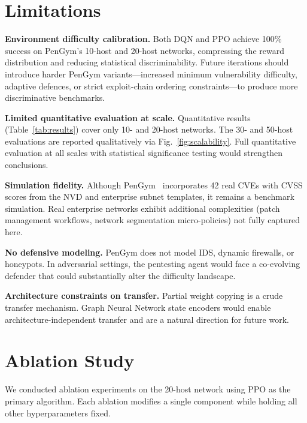 \documentclass[conference]{IEEEtran}
\begin{document}
\section{Limitations}
\label{sec:limitations}

\textbf{Environment difficulty calibration.}  Both DQN and PPO achieve
100\% success on PenGym's 10-host and 20-host networks, compressing the reward
distribution and reducing statistical discriminability.  Future
iterations should introduce harder PenGym variants---increased minimum
vulnerability difficulty, adaptive defences, or strict exploit-chain
ordering constraints---to produce more discriminative benchmarks.

\textbf{Limited quantitative evaluation at scale.}  Quantitative
results (Table~\ref{tab:results}) cover only 10- and 20-host networks.
The 30- and 50-host evaluations are reported qualitatively via
Fig.~\ref{fig:scalability}.  Full quantitative evaluation at all
scales with statistical significance testing would strengthen
conclusions.

\textbf{Simulation fidelity.}  Although PenGym~\cite{nguyen2025cose} incorporates
42 real CVEs with CVSS scores from the NVD and enterprise subnet templates, it remains a benchmark simulation.  Real
enterprise networks exhibit additional complexities (patch management
workflows, network segmentation micro-policies) not fully captured here.

\textbf{No defensive modeling.}  PenGym does not model IDS,
dynamic firewalls, or honeypots.  In adversarial settings, the
pentesting agent would face a co-evolving defender that could
substantially alter the difficulty landscape.

\textbf{Architecture constraints on transfer.}  Partial weight copying
is a crude transfer mechanism.  Graph Neural Network state encoders
would enable architecture-independent transfer and are a natural
direction for future work.

\section{Ablation Study}
\label{sec:ablation}

We conducted ablation experiments on the 20-host network using PPO
as the primary algorithm.  Each ablation modifies a single component
while holding all other hyperparameters fixed.
\end{document}
